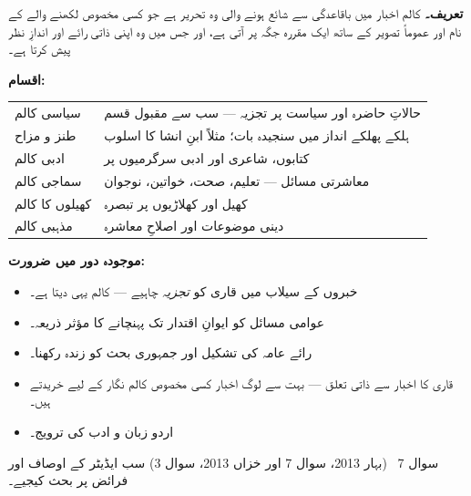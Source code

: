 \begin{hal}
\textbf{تعریف۔} کالم اخبار میں باقاعدگی سے شائع ہونے والی وہ تحریر ہے جو کسی
مخصوص لکھنے والے کے نام اور عموماً تصویر کے ساتھ ایک مقررہ جگہ پر آتی ہے، اور
جس میں وہ اپنی ذاتی رائے اور اندازِ نظر پیش کرتا ہے۔

\medskip
\textbf{اقسام:}
\begin{center}
\begin{tabular}{@{}p{3.4cm} p{11.0cm}@{}}
\toprule
سیاسی کالم & حالاتِ حاضرہ اور سیاست پر تجزیہ --- سب سے مقبول قسم \\
طنز و مزاح & ہلکے پھلکے انداز میں سنجیدہ بات؛ مثلاً ابنِ انشا کا اسلوب \\
ادبی کالم & کتابوں، شاعری اور ادبی سرگرمیوں پر \\
سماجی کالم & معاشرتی مسائل --- تعلیم، صحت، خواتین، نوجوان \\
کھیلوں کا کالم & کھیل اور کھلاڑیوں پر تبصرہ \\
مذہبی کالم & دینی موضوعات اور اصلاحِ معاشرہ \\
\bottomrule
\end{tabular}
\end{center}

\medskip
\textbf{موجودہ دور میں ضرورت:}
\begin{itemize}\setlength{\itemsep}{1pt}
  \item خبروں کے سیلاب میں قاری کو \emph{تجزیہ} چاہیے --- کالم یہی دیتا ہے۔
  \item عوامی مسائل کو ایوانِ اقتدار تک پہنچانے کا مؤثر ذریعہ۔
  \item رائے عامہ کی تشکیل اور جمہوری بحث کو زندہ رکھنا۔
  \item قاری کا اخبار سے ذاتی تعلق --- بہت سے لوگ اخبار کسی مخصوص کالم نگار
        کے لیے خریدتے ہیں۔
  \item اردو زبان و ادب کی ترویج۔
\end{itemize}

\end{hal}

\begin{sawal}{سوال \textenglish{7} \ \textnormal{\small(بہار \textenglish{2013}، سوال \textenglish{7} اور خزاں \textenglish{2013}، سوال \textenglish{3})}}
سب ایڈیٹر کے اوصاف اور فرائض پر بحث کیجیے۔
\end{sawal}

